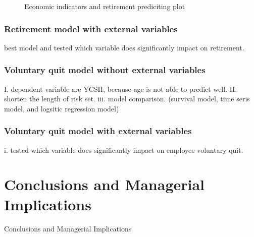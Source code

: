 \documentclass[12pt,letterpaper]{article}
\begin{document}
\begin{figure}[h!]
	\centering
	\caption{Economic indicators and retirement prediciting plot}
	\label{fig:EIndex}
\end{figure}

\subsubsection{Retirement model with external variables}
best model and tested which variable does significantly impact on retirement.
\subsubsection{Voluntary quit model without external variables}   
I. dependent variable are YCSH, because age is not able to predict well.
II. shorten the length of risk set.
iii. model comparison. (survival model, time seris model, and logsitic regression model)
\subsubsection{Voluntary quit model with external variables}
i. tested which variable does significantly impact on employee voluntary quit.

\section{Conclusions and Managerial Implications}
Conclusions and Managerial Implications
\end{document}
